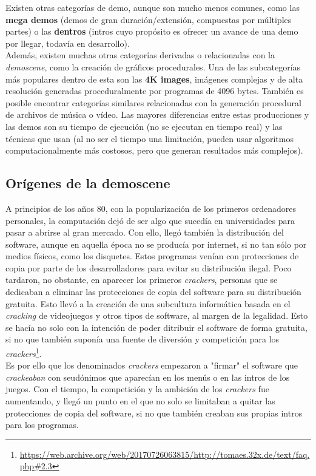 Existen otras categorías de demo, aunque son mucho menos comunes, como las \textbf{mega demos} (demos de gran duración/extensión, compuestas por múltiples partes) o las \textbf{dentros} (intros cuyo propósito es ofrecer un avance de una demo por llegar, todavía en desarrollo).\\

Además, existen muchas otras categorías derivadas o relacionadas con la \emph{demoscene}, como la creación de gráficos procedurales. Una de las subcategorías más populares dentro de esta son las \textbf{4K images}, imágenes complejas y de alta resolución generadas proceduralmente por programas de 4096 bytes. También es posible encontrar categorías similares relacionadas con la generación procedural de archivos de música o vídeo. Las mayores diferencias entre estas producciones y las demos son su tiempo de ejecución (no se ejecutan en tiempo real) y las técnicas que usan (al no ser el tiempo una limitación, pueden usar algoritmos computacionalmente más costosos, pero que generan resultados más complejos).

\subsection{Orígenes de la demoscene}

A principios de los años 80, con la popularización de los primeros ordenadores personales, la computación dejó de ser algo que sucedía en universidades para pasar a abrirse al gran mercado. Con ello, llegó también la distribución del software, aunque en aquella época no se producía por internet, si no tan sólo por medios físicos, como los disquetes. Estos programas venían con protecciones de copia por parte de los desarrolladores para evitar su distribución ilegal. Poco tardaron, no obstante, en aparecer los primeros \emph{crackers}, personas que se dedicaban a eliminar las protecciones de copia del software para su distribución gratuita. Esto llevó a la creación de una subcultura informática basada en el \emph{cracking} de videojuegos y otros tipos de software, al margen de la legalidad. Esto se hacía no solo con la intención de poder ditribuir el software de forma gratuita, si no que también suponía una fuente de diversión y competición para los \emph{crackers}\footnote{\url{https://web.archive.org/web/20170726063815/http://tomaes.32x.de/text/faq.php\#2.3}}.\\

Es por ello que los denominados \emph{crackers} empezaron a "firmar" el software que \emph{crackeaban} con seudónimos que aparecían en los menús o en las intros de los juegos. Con el tiempo, la competición y la ambición de los \emph{crackers} fue aumentando, y llegó un punto en el que no solo se limitaban a quitar las protecciones de copia del software, si no que también creaban sus propias intros para los programas.\\

